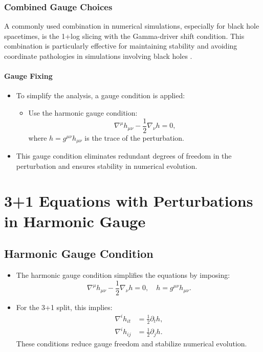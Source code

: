 \documentclass[12pt]{article}
\begin{document}
\subsubsection{Combined Gauge Choices}
A commonly used combination in numerical simulations, especially for black hole spacetimes, is the 1+log slicing with the Gamma-driver shift condition. This combination is particularly effective for maintaining stability and avoiding coordinate pathologies in simulations involving black holes \cite{campanelli2006accurate,baker2006gravitational}.


\paragraph{Gauge Fixing}
\begin{itemize}
    \item To simplify the analysis, a gauge condition is applied:
    \begin{itemize}
        \item Use the harmonic gauge condition:
        \[
        \nabla^\mu h_{\mu\nu} - \frac{1}{2} \nabla_\nu h = 0,
        \]
        where $h = g^{\mu\nu} h_{\mu\nu}$ is the trace of the perturbation.
    \end{itemize}
    \item This gauge condition eliminates redundant degrees of freedom in the perturbation and ensures stability in numerical evolution.
\end{itemize}


\section{3+1 Equations with Perturbations in Harmonic Gauge}

\subsection{Harmonic Gauge Condition}
\begin{itemize}
    \item The harmonic gauge condition simplifies the equations by imposing:
    \[
    \nabla^\mu h_{\mu\nu} - \frac{1}{2} \nabla_\nu h = 0, \quad h = g^{\mu\nu} h_{\mu\nu}.
    \]
    \item For the 3+1 split, this implies:
    \begin{align*}
        \nabla^i h_{it} &= \frac{1}{2} \partial_t h, \\
        \nabla^i h_{ij} &= \frac{1}{2} \partial_j h.
    \end{align*}
    These conditions reduce gauge freedom and stabilize numerical evolution.
\end{itemize}
\end{document}
